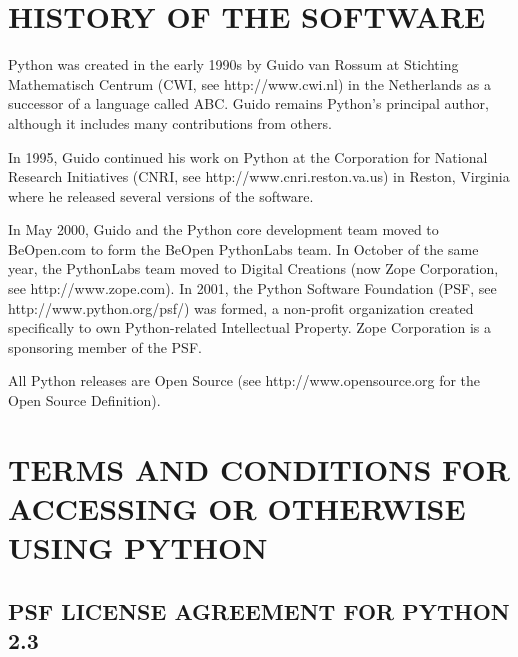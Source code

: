 \section{HISTORY OF THE SOFTWARE}

Python was created in the early 1990s by Guido van Rossum at Stichting Mathematisch Centrum (CWI, see http://www.cwi.nl) in the Netherlands as a successor of a language called ABC.  Guido remains Python's principal author, although it includes many contributions from others. 

In 1995, Guido continued his work on Python at the Corporation for National Research Initiatives (CNRI, see http://www.cnri.reston.va.us) in Reston, Virginia where he released several versions of the software.

In May 2000, Guido and the Python core development team moved to BeOpen.com to form the BeOpen PythonLabs team.  In October of the same year, the PythonLabs team moved to Digital Creations (now Zope Corporation, see http://www.zope.com).  In 2001, the Python Software Foundation (PSF, see http://www.python.org/psf/) was formed, a
non-profit organization created specifically to own Python-related Intellectual Property.  Zope Corporation is a sponsoring member of the PSF.

All Python releases are Open Source (see http://www.opensource.org for the Open Source Definition).



\section{TERMS AND CONDITIONS FOR ACCESSING OR OTHERWISE USING PYTHON}
\label{python_license}

\subsection{PSF LICENSE AGREEMENT FOR PYTHON 2.3}

